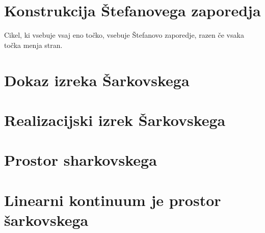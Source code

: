 \documentclass[mat2]{fmfdelo}
\begin{document}
\section{Konstrukcija Štefanovega zaporedja}
\begin{trditev}
Cikel, ki vsebuje vsaj eno točko, vsebuje Štefanovo zaporedje, razen če vsaka točka menja stran.
\end{trditev}

\section{Dokaz izreka Šarkovskega}

\section{Realizacijski izrek Šarkovskega}

\section{Prostor sharkovskega}

\section{Linearni kontinuum je prostor šarkovskega}






\cleardoublepage                           %

\cleardoublepage                           %
\printindex
\end{document}
